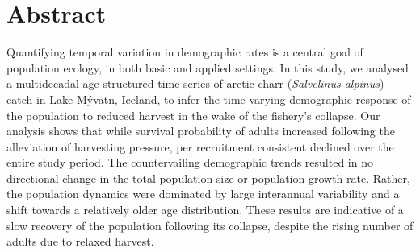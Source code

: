 
\section*{Abstract} \label{abstract}

Quantifying temporal variation in demographic rates is a central goal of population ecology,
in both basic and applied settings.
In this study, we analysed a multidecadal age-structured time series 
of arctic charr (\emph{Salvelinus alpinus}) catch  in Lake M\'{y}vatn, Iceland, 
to infer the time-varying demographic response of the population 
to reduced harvest in the wake of the fishery's collapse.
Our analysis shows that while survival probability of adults increased following the alleviation
of harvesting pressure, per recruitment consistent declined over the entire study period.
The countervailing demographic trends resulted 
in no directional change in the total population size or population growth rate.
Rather, the population dynamics were dominated by large interannual variability
and a shift towards a relatively older age distribution.
These results are indicative of a slow recovery of the population following its collapse,
despite the rising number of adults due to relaxed harvest.

